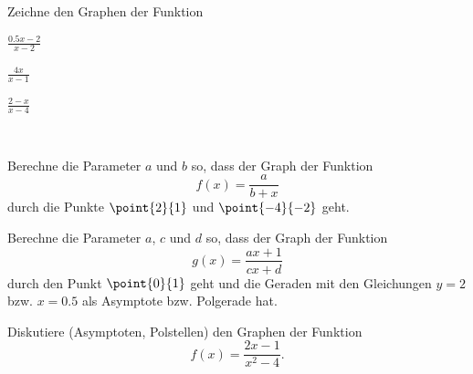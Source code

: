 \documentclass[%
11pt,%
twoside,%
titlepage,%
german,%
headsepline%
]{scrartcl}
\begin{document}
\begin{ueb}
Zeichne den Graphen der Funktion

\begin{minipage}{0.32\textwidth}
\begin{enumeratea}
\item $\frac{0.5x-2}{x-2}$
\end{enumeratea}
\end{minipage}
\begin{minipage}{0.32\textwidth}
\begin{enumeratea}
\addtocounter{enumi}{1}
\item $\frac{4x}{x-1}$
\end{enumeratea}
\end{minipage}
\begin{minipage}{0.32\textwidth}
\begin{enumeratea}
\addtocounter{enumi}{2}
\item $\frac{2-x}{x-4}$
\end{enumeratea}
\end{minipage} 
\end{ueb}


\begin{ueb}
\ \\[-2ex]
\begin{enumeratea}
\item Berechne die Parameter $a$ und $b$ so, dass der Graph der Funktion
$$f(x)=\frac{a}{b+x}$$
durch die Punkte $\point{2}{1}$ und $\point{-4}{-2}$ geht.
\item Berechne die Parameter $a$, $c$ und $d$ so, dass der Graph der Funktion
$$g(x)=\frac{ax+1}{cx+d}$$
durch den Punkt $\point{0}{1}$ geht und die Geraden mit den Gleichungen $y=2$ bzw. $x=0.5$ als Asymptote bzw. Polgerade hat.
\end{enumeratea}
\end{ueb}

\begin{ueb}[interpretiere]
Diskutiere (Asymptoten, Polstellen) den Graphen der Funktion
$$f(x)=\frac{2x-1}{x^2-4}.$$
\end{ueb}
\end{document}
